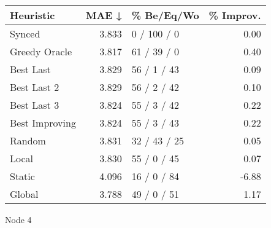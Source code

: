 \begin{tabular}{lrlr}
\toprule
\textbf{Heuristic} & \textbf{MAE ↓} & \textbf{\% Be/Eq/Wo} & \textbf{\% Improv.} \\
\midrule
            Synced &          3.833 &          0 / 100 / 0 &                0.00 \\
     Greedy Oracle &          3.817 &          61 / 39 / 0 &                0.40 \\
         Best Last &          3.829 &          56 / 1 / 43 &                0.09 \\
       Best Last 2 &          3.829 &          56 / 2 / 42 &                0.10 \\
       Best Last 3 &          3.824 &          55 / 3 / 42 &                0.22 \\
    Best Improving &          3.824 &          55 / 3 / 43 &                0.22 \\
            Random &          3.831 &         32 / 43 / 25 &                0.05 \\
             Local &          3.830 &          55 / 0 / 45 &                0.07 \\
            Static &          4.096 &          16 / 0 / 84 &               -6.88 \\
            Global &          3.788 &          49 / 0 / 51 &                1.17 \\
\bottomrule
\end{tabular}
\caption{Node 4}
\label{tab:ds_non_lr01_le1_bs4_4}
